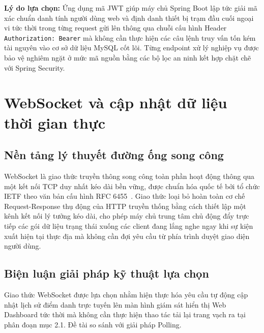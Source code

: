 ﻿\documentclass[../DoAn.tex]{subfiles}
\begin{document}
\textbf{Lý do lựa chọn:} Ứng dụng mã JWT giúp máy chủ Spring Boot lập tức giải mã xác chuẩn danh tính người dùng web và định danh thiết bị trạm đầu cuối ngoại vi tức thời trong từng request gửi lên thông qua chuỗi cấu hình Header \texttt{Authorization: Bearer} mà không cần thực hiện các câu lệnh truy vấn tốn kém tài nguyên vào cơ sở dữ liệu MySQL cốt lõi. Từng endpoint xử lý nghiệp vụ được bảo vệ nghiêm ngặt ở mức mã nguồn bằng các bộ lọc an ninh kết hợp chặt chẽ với Spring Security.

\clearpage

\section{WebSocket và cập nhật dữ liệu thời gian thực}
\label{section:3.6}

\subsection{Nền tảng lý thuyết đường ống song công}

WebSocket là giao thức truyền thông song công toàn phần hoạt động thông qua một kết nối TCP duy nhất kéo dài bền vững, được chuẩn hóa quốc tế bởi tổ chức IETF theo văn bản cấu hình RFC 6455~\cite{rfc6455}. Giao thức loại bỏ hoàn toàn cơ chế Request-Response thụ động của HTTP truyền thống bằng cách thiết lập một kênh kết nối lý tưởng kéo dài, cho phép máy chủ trung tâm chủ động đẩy trực tiếp các gói dữ liệu trạng thái xuống các client đang lắng nghe ngay khi sự kiện xuất hiện tại thực địa mà không cần đợi yêu cầu từ phía trình duyệt giao diện người dùng.

\subsection{Biện luận giải pháp kỹ thuật lựa chọn}

Giao thức WebSocket được lựa chọn nhằm hiện thực hóa yêu cầu tự động cập nhật lịch sử điểm danh trực tuyến lên màn hình giám sát hiển thị Web Dashboard tức thời mà không cần thực hiện thao tác tải lại trang vạch ra tại phân đoạn mục 2.1. Đề tài so sánh với giải pháp Polling.
\end{document}
